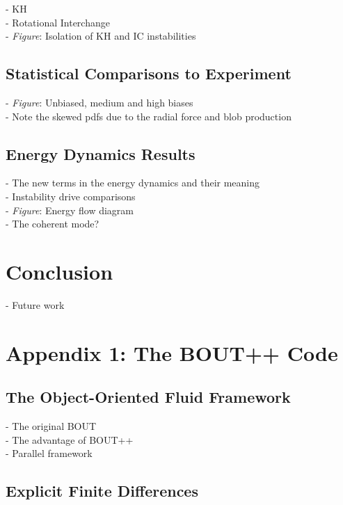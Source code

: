 \documentclass[12pt]{article}
\begin{document}
- KH \\
- Rotational Interchange \\
- \emph{Figure}: Isolation of KH and IC instabilities

\subsection{Statistical Comparisons to Experiment}

- \emph{Figure}: Unbiased, medium and high biases \\
- Note the skewed pdfs due to the radial force and blob production \\

\subsection{Energy Dynamics Results}

- The new terms in the energy dynamics and their meaning \\
- Instability drive comparisons \\
- \emph{Figure}: Energy flow diagram \\
- The coherent mode? \\

\section{Conclusion}

- Future work \\

\section{Appendix 1: The BOUT++ Code}

\subsection{The Object-Oriented Fluid Framework}

- The original BOUT \\
- The advantage of BOUT++ \\
- Parallel framework \\

\subsection{Explicit Finite Differences}
\end{document}

